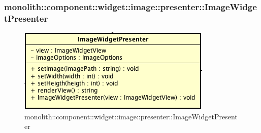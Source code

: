 \subsubsection{monolith::component::widget::image::presenter::ImageWidgetPresenter}

\label{monolith::component::widget::image::presenter::ImageWidgetPresenter}
\begin{figure}[ht]
	\centering
	\includegraphics[scale=0.5]{Sezioni/SottosezioniST/img/ImageWidgetPresenter.png}
	\caption{monolith::component::widget::image::presenter::ImageWidgetPresenter}
\end{figure}

